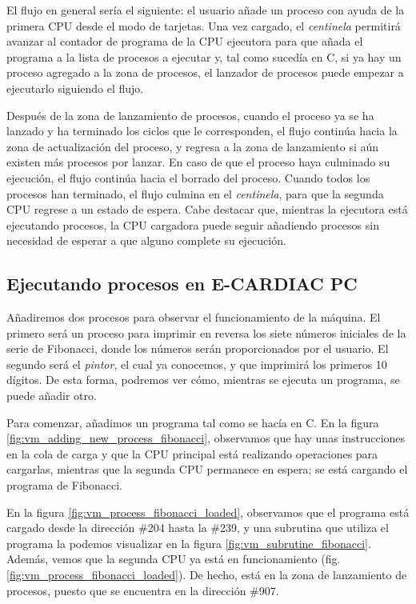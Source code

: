 \documentclass[letterpaper,12pt,oneside]{book}
\begin{document}
			
				El flujo en general sería el siguiente: el usuario añade un proceso con ayuda de la primera CPU
				desde el modo de tarjetas. Una vez cargado,
				el \textit{centinela} permitirá avanzar al contador de programa de la CPU ejecutora
				 para que añada el programa a la lista
				de procesos a ejecutar y, tal como sucedía en C, si ya hay un proceso agregado a la zona de procesos, el lanzador de procesos
				puede empezar a ejecutarlo siguiendo el flujo. 
				
				Después de la zona de lanzamiento de procesos, cuando el proceso ya se ha lanzado y ha terminado los ciclos que le corresponden,
				el flujo continúa  hacia la zona de actualización del proceso, y regresa a 
				la zona de lanzamiento si aún existen más procesos por lanzar. En caso de que
				el proceso haya culminado su ejecución, el flujo continúa hacia el borrado del proceso. 
				Cuando todos los procesos han terminado, el flujo culmina en el \textit{centinela}, para que
				la segunda CPU regrese a un estado de espera. Cabe destacar que, mientras la ejecutora está ejecutando procesos, la CPU cargadora
				puede seguir añadiendo procesos sin necesidad de esperar a que alguno complete su ejecución.

			\clearpage	
			
		\subsection{Ejecutando procesos en E-CARDIAC PC}		
			
			Añadiremos dos procesos para observar el funcionamiento de la máquina. El primero será un proceso para imprimir en reversa los 
			siete números iniciales de la serie de Fibonacci, donde los números serán proporcionados por el usuario.
			 El segundo será el
			\textit{pintor}, el cual ya conocemos, y que imprimirá los primeros 10 dígitos. De esta forma, podremos ver cómo,
			mientras se ejecuta un programa, se puede añadir otro.
		
			
			Para comenzar, añadimos un programa tal como se hacía en C. En la figura \ref{fig:vm_adding_new_process_fibonacci},
			observamos que hay unas instrucciones 
			en la cola de carga y que la CPU principal está realizando operaciones para
			cargarlas, mientras que la segunda CPU
			permanece en espera; se está cargando el programa de Fibonacci. 
			
			En la figura \ref{fig:vm_process_fibonacci_loaded}, observamos que el programa está cargado desde la dirección \#204 hasta la \#239,
			y una subrutina que utiliza el programa la podemos visualizar en la figura \ref{fig:vm_subrutine_fibonacci}. Además,
			vemos que la segunda CPU ya está en funcionamiento (fig. \ref{fig:vm_process_fibonacci_loaded}). 
			De hecho, está en la zona de lanzamiento de procesos, puesto que se encuentra
			en la dirección \#907.
			
\end{document}
